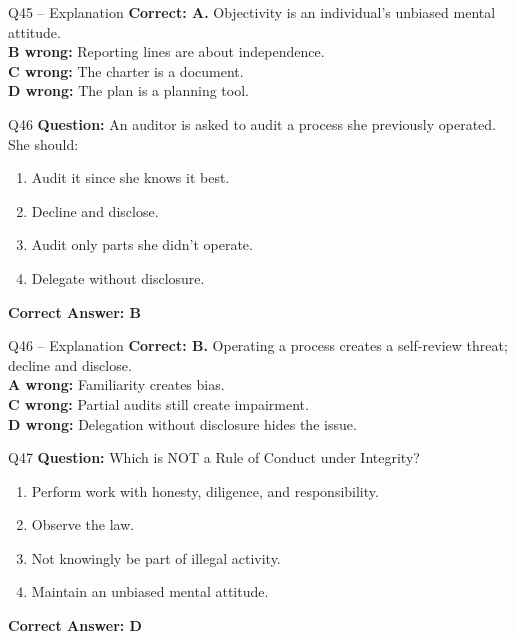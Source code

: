 \documentclass[aspectratio=169,10pt]{beamer}
\begin{document}
	\begin{frame}[t]{Q45 -- Explanation}
		\small
		\textbf{Correct: A.} Objectivity is an individual's unbiased mental attitude. \\[4pt]
		\textbf{B wrong:} Reporting lines are about independence. \\[2pt]
		\textbf{C wrong:} The charter is a document. \\[2pt]
		\textbf{D wrong:} The plan is a planning tool.
	\end{frame}
	
	\begin{frame}[t]{Q46}
		\small
		\textbf{Question:} An auditor is asked to audit a process she previously operated. She should:
		\begin{enumerate}[label=\Alph*.,itemsep=1pt,topsep=2pt]
			\item Audit it since she knows it best.
			\item Decline and disclose.
			\item Audit only parts she didn't operate.
			\item Delegate without disclosure.
		\end{enumerate}
		\vspace{4pt}
		\textbf{Correct Answer: B}
	\end{frame}
	
	\begin{frame}[t]{Q46 -- Explanation}
		\small
		\textbf{Correct: B.} Operating a process creates a self-review threat; decline and disclose. \\[4pt]
		\textbf{A wrong:} Familiarity creates bias. \\[2pt]
		\textbf{C wrong:} Partial audits still create impairment. \\[2pt]
		\textbf{D wrong:} Delegation without disclosure hides the issue.
	\end{frame}
	
	\begin{frame}[t]{Q47}
		\small
		\textbf{Question:} Which is NOT a Rule of Conduct under Integrity?
		\begin{enumerate}[label=\Alph*.,itemsep=1pt,topsep=2pt]
			\item Perform work with honesty, diligence, and responsibility.
			\item Observe the law.
			\item Not knowingly be part of illegal activity.
			\item Maintain an unbiased mental attitude.
		\end{enumerate}
		\vspace{4pt}
		\textbf{Correct Answer: D}
	\end{frame}
	
\end{document}
